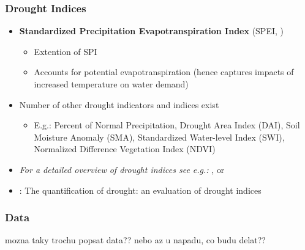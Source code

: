 \documentclass{beamer}              %
\begin{document}
\begin{frame}\label{Indices3}
\frametitle{Drought Indices} 

 \begin{itemize}
 \item \textbf{Standardized Precipitation Evapotranspiration Index} (SPEI, \citealp{SPEI})
\begin{itemize}
\item Extention of SPI
\item Accounts for potential evapotranspiration (hence captures impacts of increased temperature on water demand)
\end{itemize}
\item Number of other drought indicators and indices exist
\begin{itemize}
\item E.g.: Percent of Normal Precipitation, Drought Area Index (DAI), Soil Moisture Anomaly (SMA), Standardized Water-level Index (SWI), Normalized Difference Vegetation Index (NDVI)
\end{itemize}
\item  \textit{For a detailed overview of drought indices see e.g.:} \cite{monacelli2005}, \cite{svoboda2016} or \cite{zargar2011}

\item \cite{keyantash2002}: The quantification of drought: an evaluation of drought indices
\end{itemize} 


\end{frame}










\begin{frame}

\frametitle{Data}\label{data} 

mozna taky trochu popsat data?? nebo az u napadu, co budu delat??

\end{frame}
\end{document}
